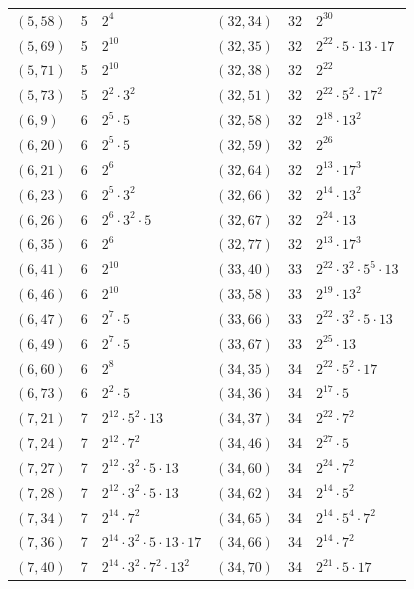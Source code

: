 \documentclass[11pt]{article}
\begin{document}
\begin{longtable}{@{}lrl@{\qquad}lrl@{}}
$(5,58)$ & 5 & $2^{4}$ & $(32,34)$ & 32 & $2^{30}$\\
$(5,69)$ & 5 & $2^{10}$ & $(32,35)$ & 32 & $2^{22}\cdot 5\cdot 13\cdot 17$\\
$(5,71)$ & 5 & $2^{10}$ & $(32,38)$ & 32 & $2^{22}$\\
$(5,73)$ & 5 & $2^{2}\cdot 3^{2}$ & $(32,51)$ & 32 & $2^{22}\cdot 5^{2}\cdot 17^{2}$\\
$(6,9)$ & 6 & $2^{5}\cdot 5$ & $(32,58)$ & 32 & $2^{18}\cdot 13^{2}$\\
$(6,20)$ & 6 & $2^{5}\cdot 5$ & $(32,59)$ & 32 & $2^{26}$\\
$(6,21)$ & 6 & $2^{6}$ & $(32,64)$ & 32 & $2^{13}\cdot 17^{3}$\\
$(6,23)$ & 6 & $2^{5}\cdot 3^{2}$ & $(32,66)$ & 32 & $2^{14}\cdot 13^{2}$\\
$(6,26)$ & 6 & $2^{6}\cdot 3^{2}\cdot 5$ & $(32,67)$ & 32 & $2^{24}\cdot 13$\\
$(6,35)$ & 6 & $2^{6}$ & $(32,77)$ & 32 & $2^{13}\cdot 17^{3}$\\
$(6,41)$ & 6 & $2^{10}$ & $(33,40)$ & 33 & $2^{22}\cdot 3^{2}\cdot 5^{5}\cdot 13$\\
$(6,46)$ & 6 & $2^{10}$ & $(33,58)$ & 33 & $2^{19}\cdot 13^{2}$\\
$(6,47)$ & 6 & $2^{7}\cdot 5$ & $(33,66)$ & 33 & $2^{22}\cdot 3^{2}\cdot 5\cdot 13$\\
$(6,49)$ & 6 & $2^{7}\cdot 5$ & $(33,67)$ & 33 & $2^{25}\cdot 13$\\
$(6,60)$ & 6 & $2^{8}$ & $(34,35)$ & 34 & $2^{22}\cdot 5^{2}\cdot 17$\\
$(6,73)$ & 6 & $2^{2}\cdot 5$ & $(34,36)$ & 34 & $2^{17}\cdot 5$\\
$(7,21)$ & 7 & $2^{12}\cdot 5^{2}\cdot 13$ & $(34,37)$ & 34 & $2^{22}\cdot 7^{2}$\\
$(7,24)$ & 7 & $2^{12}\cdot 7^{2}$ & $(34,46)$ & 34 & $2^{27}\cdot 5$\\
$(7,27)$ & 7 & $2^{12}\cdot 3^{2}\cdot 5\cdot 13$ & $(34,60)$ & 34 & $2^{24}\cdot 7^{2}$\\
$(7,28)$ & 7 & $2^{12}\cdot 3^{2}\cdot 5\cdot 13$ & $(34,62)$ & 34 & $2^{14}\cdot 5^{2}$\\
$(7,34)$ & 7 & $2^{14}\cdot 7^{2}$ & $(34,65)$ & 34 & $2^{14}\cdot 5^{4}\cdot 7^{2}$\\
$(7,36)$ & 7 & $2^{14}\cdot 3^{2}\cdot 5\cdot 13\cdot 17$ & $(34,66)$ & 34 & $2^{14}\cdot 7^{2}$\\
$(7,40)$ & 7 & $2^{14}\cdot 3^{2}\cdot 7^{2}\cdot 13^{2}$ & $(34,70)$ & 34 & $2^{21}\cdot 5\cdot 17$\\

\end{longtable}
\end{document}
